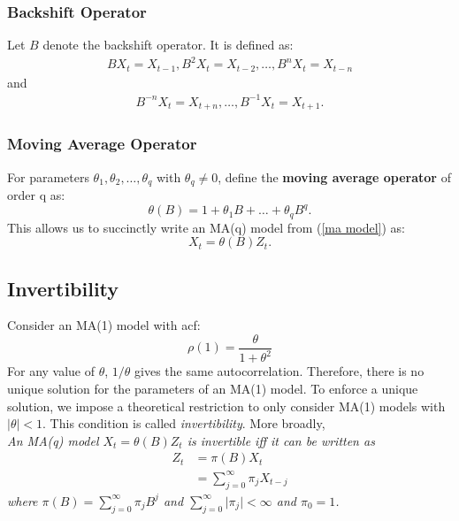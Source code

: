 \documentclass{article}
\begin{document}
\subsubsection{Backshift Operator}
Let $B$ denote the backshift operator. It is defined as:
\begin{align}
    BX_t=X_{t-1}, B^2X_t=X_{t-2}, \ldots, B^nX_t=X_{t-n}\nonumber
\end{align}
and
\begin{align}
    B^{-n}X_t=X_{t+n}, \ldots, B^{-1}X_t=X_{t+1}.\nonumber
\end{align}
\subsubsection{Moving Average Operator}
For parameters $\theta_1, \theta_{2}, \ldots, \theta_{q}$ with $\theta_q \neq 0$, define the \textbf{moving average operator} of order q as:
\begin{equation}\label{moving average operator}
    \theta(B) = 1 + \theta_1 B + \ldots + \theta_q B^q.
\end{equation}
This allows us to succinctly write an MA(q) model from (\ref{ma model}) as:
\begin{equation}
    X_t = \theta(B)Z_t.
\end{equation}
\subsection{Invertibility}
Consider an MA(1) model with acf:
\begin{equation}
    \rho(1)=\frac{\theta}{1 + \theta^2}\nonumber
\end{equation}
For any value of $\theta$, $1/\theta$ gives the same autocorrelation. Therefore, there is no unique solution for the parameters of an MA(1) model. To enforce a unique solution, we impose a theoretical restriction to only consider MA(1) models with $\lvert \theta \rvert < 1$. This condition is called \emph{invertibility}. More broadly, \\
\textit{An MA(q) model $X_t=\theta(B)Z_t$ is invertible iff it can be written as
\begin{align}\label{invertible}
    Z_t&=\pi(B)X_t\nonumber\\
    &= \sum_{j=0}^{\infty} \pi_j X_{t-j}
\end{align}
where $\pi(B)=\sum_{j=0}^{\infty} \pi_j B^j$ and $\sum_{j=0}^{\infty} \lvert \pi_j \rvert < \infty$ and $\pi_0=1$.}
\end{document}
